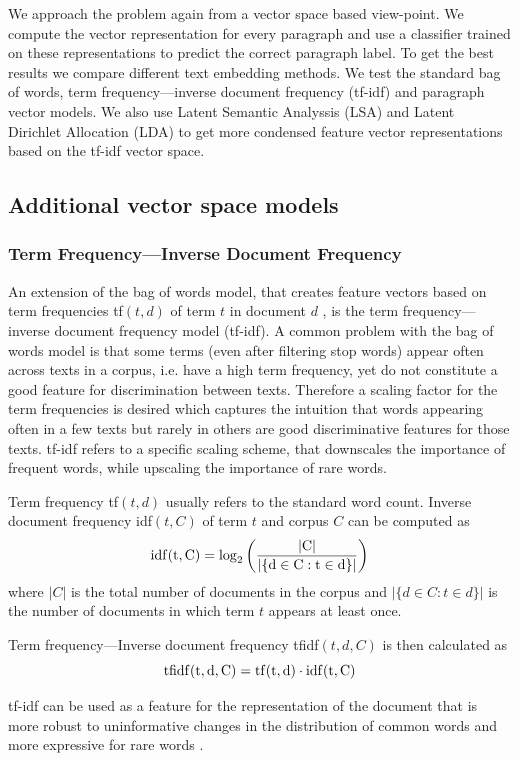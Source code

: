 We approach the problem again from a vector space based view-point. We compute the vector representation for every paragraph and use a classifier trained on these representations to predict the correct paragraph label. To get the best results we compare different text embedding methods. We test the standard bag of words, term frequency---inverse document frequency (tf-idf) and paragraph vector models. We also use Latent Semantic Analyssis (LSA) and Latent Dirichlet Allocation (LDA) to get more condensed feature vector representations based on the tf-idf vector space.

\subsection*{Additional vector space models}

\subsubsection*{Term Frequency---Inverse Document Frequency}

An extension of the bag of words model, that creates feature vectors based on term frequencies tf$(t,d)$ of term $t$ in document $d$ , is the term frequency---inverse document frequency model (tf-idf).
A common problem with the bag of words model is that some terms (even
after filtering stop words) appear often across texts in a corpus,
i.e. have a high term frequency, yet do not constitute a good feature
for discrimination between texts. Therefore a scaling factor for the
term frequencies is desired which captures the intuition that words
appearing often in a few texts but rarely in others are good discriminative
features for those texts. tf-idf refers to a specific scaling scheme, that downscales the
importance of frequent words, while upscaling the importance of rare
words. 

Term frequency tf$(t,d)$ usually refers to the standard word count.
Inverse document frequency idf$(t,C)$ of term $t$ and corpus $C$
can be computed as 
\[
\rm{idf}(t,C)=\log_{2}\left(\frac{|C|}{|\{d\in C:t\in d\}|}\right)
\]
where $|C|$ is the total number of documents in the corpus and $|\{d\in C:t\in d\}|$
is the number of documents in which term $t$ appears at least once.

Term frequency---Inverse document frequency tfidf$(t,d,C)$ is then
calculated as 
\[
\rm{tfidf}(t,d,C)=\rm{tf}(t,d)\cdot \rm{idf}(t,C)
\]


tf-idf can be used as a feature for the representation of the document
that is more robust to uninformative changes in the distribution of
common words and more expressive for rare words \citep{Manning2008vect}.


